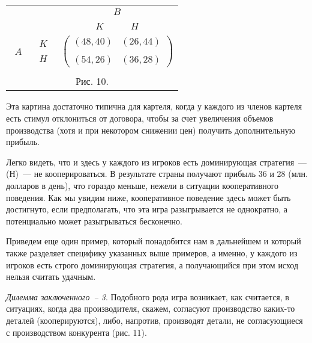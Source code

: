 \documentclass[12pt]{article}
\begin{document}
\begin{center}
\begin{tabular}{ccc}
&&$\begin{array}{c} B\end{array}$\\
&&$\begin{array}{cc}  K\quad &\quad H \end{array}$\\
$\begin{array}{c} \\ A \\ \end{array}$& $\begin{array}{c} K\\ \\ H
\end{array}$&
$\left(\begin{array}{cc} (48,40)& (26,44)\\
\\
(54,26)&(36,28)\end{array}\right)$\\
\multicolumn{3}{c}{}\\
\multicolumn{3}{c}{Рис. 10.}\\
\end{tabular}
\end{center}

Эта картина достаточно типична для картеля, когда у каждого из
членов картеля есть стимул отклониться от договора, чтобы за счет
увеличения объемов производства (хотя и при некотором снижении
цен) получить дополнительную прибыль.

Легко видеть, что и здесь у каждого из игроков есть доминирующая
стратегия~--- (Н)~--- не кооперироваться. В результате страны
получают прибыль 36 и 28 (млн. долларов в день), что гораздо меньше,
нежели в ситуации кооперативного поведения. Как мы увидим ниже,
кооперативное поведение здесь может быть достигнуто, если
предполагать, что эта игра разыгрывается не однократно, а
потенциально может разыгрываться бесконечно.

Приведем еще один пример, который понадобится нам в дальнейшем и
который также разделяет специфику указанных выше примеров, а
именно, у каждого из игроков есть строго доминирующая стратегия, а
получающийся при этом исход нельзя считать удачным.

{\it Дилемма заключенного~-- 3}. Подобного рода игра возникает, как
считается, в ситуациях, когда два производителя, скажем, согласуют
производство каких-то деталей (кооперируются), либо, напротив,
производят детали, не согласующиеся с производством конкурента (рис. 11).
\end{document}
